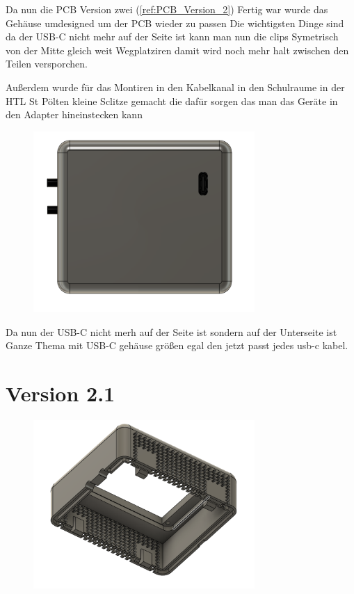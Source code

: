 \begin{inhalt}
Da nun die PCB Version zwei (\ref{ref:PCB_Version_2}) Fertig war wurde das Gehäuse umdesigned um der PCB wieder zu passen Die wichtigsten Dinge sind da der USB-C nicht mehr auf der Seite ist kann man nun die clips Symetrisch von der Mitte gleich weit Wegplatziren damit wird noch mehr halt zwischen den Teilen versporchen.  

Außerdem wurde für das Montiren in den Kabelkanal in den Schulraume in der HTL St Pölten  kleine Sclitze gemacht die dafür sorgen das man das Geräte in den Adapter hineinstecken kann

\begin{figure}[!htb]
\centering
\includegraphics[width=0.75\textwidth]{files/Thomas/pics/geheause/2.0/gehaeuse_bot.png}
\caption[Bildbezeichnung für Abbildungsverzeichnis]{}
\label{fig:gehaeuse_internet_bild}
\end{figure}

Da nun der USB-C nicht merh auf der Seite ist sondern auf der Unterseite ist Ganze Thema mit USB-C gehäuse größen egal den jetzt passt jedes usb-c kabel. 

\section{Version 2.1}

\begin{figure}[!htb]
\centering
\includegraphics[width=0.75\textwidth]{files/Thomas/pics/geheause/2.1/gehaeuse_side.png}
\caption[Bildbezeichnung für Abbildungsverzeichnis]{}
\label{fig:gehaeuse_internet_bild}
\end{figure}


\end{inhalt}
